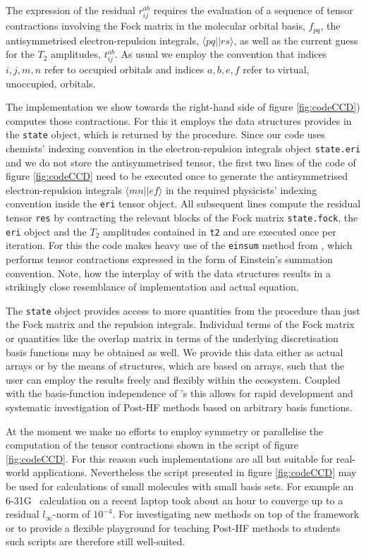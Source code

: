 The expression of the \CCD residual $r_{ij}^{ab}$
requires the evaluation of a sequence of tensor contractions
involving the Fock matrix in the molecular orbital basis, $f_{pq}$,
the antisymmetrised electron-repulsion integrals, $\langle pq||rs \rangle$,
as well as the current guess for the $T_2$ amplitudes, $t_{ij}^{ab}$.
As usual we employ the convention that indices $i,j,m,n$ refer
to occupied orbitals and indices $a,b,e,f$
refer to virtual, \ie unoccupied, orbitals.

The \python implementation we show towards the right-hand side
of figure \ref{fig:codeCCD})
computes those contractions.
For this it employs the data structures \molsturm provides
in the \texttt{state} object, which is returned by the \SCF procedure.
Since our code uses chemists' indexing convention
in the electron-repulsion integrals object \texttt{state.eri}
and we do not store the antisymmetrised tensor,
the first two lines of the code of figure \ref{fig:codeCCD}
need to be executed once to generate
the antisymmetrised electron-repulsion integrals $\langle mn||ef \rangle$
in the required physicists' indexing convention
inside the \texttt{eri} tensor object.
All subsequent lines compute the residual tensor \texttt{res}
by contracting the relevant blocks of the Fock matrix \texttt{state.fock},
the \texttt{eri} object and the $T_2$ amplitudes contained in \texttt{t2}
and are executed once per \CCD iteration.
For this the code makes heavy use of the \texttt{einsum} method from \numpy,
which performs tensor contractions
expressed in the form of Einstein's summation convention.
Note, how the interplay of \numpy
with the data structures \molsturm results in a
strikingly close resemblance of implementation and actual equation.

The \texttt{state} object
provides access to more quantities from the \SCF procedure
than just the Fock matrix and the repulsion integrals.
Individual terms of the Fock matrix or
quantities like the overlap matrix in terms of the underlying
discretisation basis functions may be obtained as well.
We provide this data either as actual \numpy arrays
or by the means of structures,
which are based on \numpy arrays,
such that the user can employ the \SCF results freely and flexibly
within the \python ecosystem.
Coupled with the basis-function independence of \molsturm's
\SCF this allows for rapid development and systematic investigation
of Post-HF methods based on arbitrary basis functions.

At the moment we make no efforts to employ symmetry or parallelise
the computation of the tensor contractions
shown in the script of figure \ref{fig:codeCCD}.
For this reason such implementations are all but suitable for
real-world applications.
Nevertheless the script presented in figure \ref{fig:codeCCD}
may be used for \CCD calculations of small molecules with small basis sets.
For example an  6-31G~\cite{Hehre1972} calculation on a recent laptop took
about an hour to converge up to a residual $l_\infty$-norm of $10^{-4}$.
For investigating new methods on top of the \molsturm framework
or to provide a flexible playground for teaching Post-HF methods to students
such scripts are therefore still well-suited.

